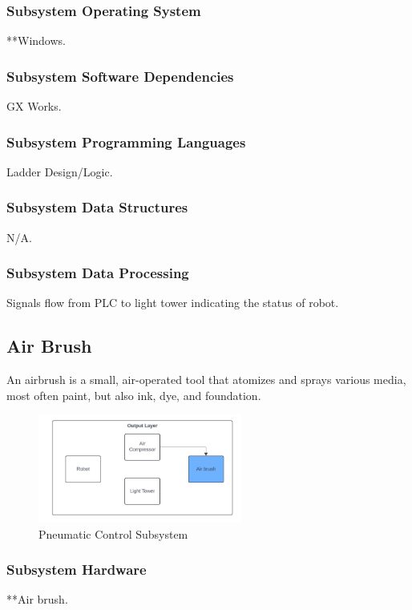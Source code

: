 \subsubsection{Subsystem Operating System}
**Windows.

\subsubsection{Subsystem Software Dependencies}
GX Works.

\subsubsection{Subsystem Programming Languages}
Ladder Design/Logic.

\subsubsection{Subsystem Data Structures}
N/A.

\subsubsection{Subsystem Data Processing}
Signals flow from PLC to light tower indicating the status of robot.

\subsection{Air Brush}
An airbrush is a small, air-operated tool that atomizes and sprays various media, most often paint, but also ink, dye, and foundation.

\begin{figure}[h!]
	\centering
 	\includegraphics[width=0.60\textwidth]{images/AirBrush_output.png}
 \caption{Pneumatic Control Subsystem}
\end{figure}

\subsubsection{Subsystem Hardware}
**Air brush.

